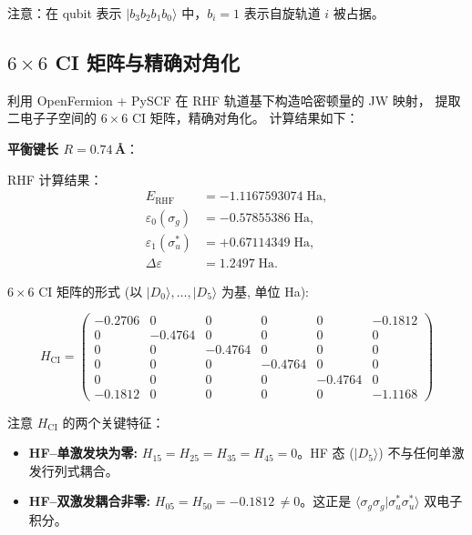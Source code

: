 \documentclass[fontset=mac]{ctexart}
\newcommand{\ket}[1]{|#1\rangle}
\newcommand{\braket}[2]{\langle #1|#2\rangle}
\begin{document}
注意：在 qubit 表示 $\ket{b_3 b_2 b_1 b_0}$ 中，$b_i=1$ 表示自旋轨道 $i$ 被占据。

\subsection*{$6\times 6$ CI 矩阵与精确对角化}

利用 OpenFermion + PySCF 在 RHF 轨道基下构造哈密顿量的 JW 映射，
提取二电子子空间的 $6\times 6$ CI 矩阵，精确对角化。
计算结果如下：

\textbf{平衡键长 $R=0.74$\,\AA}：

RHF 计算结果：
\begin{align*}
    E_{\text{RHF}} &= -1.1167593074\;\text{Ha}, \\
    \varepsilon_0(\sigma_g) &= -0.57855386\;\text{Ha}, \\
    \varepsilon_1(\sigma_u^*) &= +0.67114349\;\text{Ha}, \\
    \Delta\varepsilon &= 1.2497\;\text{Ha}.
\end{align*}

$6\times 6$ CI 矩阵的形式 (以 $\ket{D_0},\ldots,\ket{D_5}$ 为基, 单位 Ha):

\begin{equation}
H_{\text{CI}} = \begin{pmatrix}
-0.2706 &  0      &  0      &  0      &  0      & -0.1812 \\
 0      & -0.4764 &  0      &  0      &  0      &  0      \\
 0      &  0      & -0.4764 &  0      &  0      &  0      \\
 0      &  0      &  0      & -0.4764 &  0      &  0      \\
 0      &  0      &  0      &  0      & -0.4764 &  0      \\
-0.1812 &  0      &  0      &  0      &  0      & -1.1168
\end{pmatrix}
\end{equation}

注意 $H_{\text{CI}}$ 的两个关键特征：
\begin{itemize}
    \item \textbf{HF--单激发块为零:} $H_{15}=H_{25}=H_{35}=H_{45}=0$。HF 态 ($\ket{D_5}$) 不与任何单激发行列式耦合。
    \item \textbf{HF--双激发耦合非零:} $H_{05}=H_{50} = -0.1812$\,$\neq 0$。这正是 $\braket{\sigma_g\sigma_g}{\sigma_u^*\sigma_u^*}$ 双电子积分。
\end{itemize}
\end{document}
